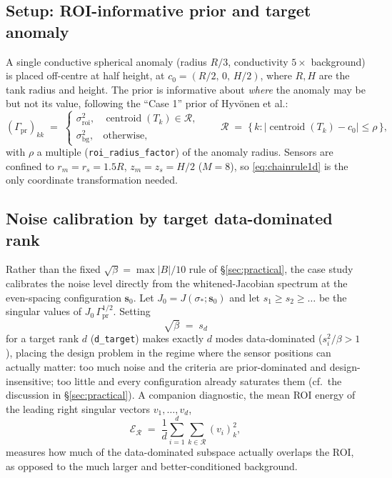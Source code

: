 \documentclass[11pt,a4paper]{article}
\newcommand{\Gprior}{\Gamma_{\mathrm{pr}}}
\newcommand{\code}[1]{\texttt{#1}}
\begin{document}
\subsection{Setup: ROI-informative prior and target anomaly}

A single conductive spherical anomaly (radius $R/3$, conductivity $5\times$ background) is placed
off-centre at half height, at $c_0 = (R/2,\,0,\,H/2)$, where $R,H$ are the tank radius and height.
The prior is informative about \emph{where} the anomaly may be but not its value, following the
``Case 1'' prior of Hyv\"onen et al.:
\begin{equation}
\label{eq:roiprior}
  (\Gprior)_{kk} \;=\;
  \begin{cases}
    \sigma_{\mathrm{roi}}^2, & \operatorname{centroid}(T_k) \in \mathcal{R}, \\[2pt]
    \sigma_{\mathrm{bg}}^2, & \text{otherwise},
  \end{cases}
  \qquad
  \mathcal{R} \;=\; \{\, k : |\operatorname{centroid}(T_k) - c_0| \le \rho \,\},
\end{equation}
with $\rho$ a multiple (\code{roi\_radius\_factor}) of the anomaly radius. Sensors are confined to
$r_m = r_s = 1.5R$, $z_m = z_s = H/2$ ($M = 8$), so \eqref{eq:chainrule1d} is the only
coordinate transformation needed.

\subsection{Noise calibration by target data-dominated rank}

Rather than the fixed $\sqrt\beta = \max|B|/10$ rule of \S\ref{sec:practical}, the case study
calibrates the noise level directly from the whitened-Jacobian spectrum at the even-spacing
configuration $\bm s_0$. Let $J_0 = J(\sigma_*;\bm s_0)$ and let $s_1 \ge s_2 \ge \dots$ be the
singular values of $J_0\, \Gprior^{1/2}$. Setting
\begin{equation}
\label{eq:noisecal}
  \sqrt\beta \;=\; s_{d}
\end{equation}
for a target rank $d$ (\code{d\_target}) makes exactly $d$ modes data-dominated
($s_i^2/\beta > 1$), placing the design problem in the regime where the sensor positions can
actually matter: too much noise and the criteria are prior-dominated and design-insensitive; too
little and every configuration already saturates them (cf.\ the discussion in
\S\ref{sec:practical}). A companion diagnostic, the mean ROI energy of the leading right
singular vectors $v_1,\dots,v_d$,
\begin{equation}
\label{eq:roienergy}
  \mathcal{E}_{\mathcal R} \;=\; \frac{1}{d} \sum_{i=1}^{d} \sum_{k \in \mathcal R} (v_i)_k^2 ,
\end{equation}
measures how much of the data-dominated subspace actually overlaps the ROI, as opposed to the
much larger and better-conditioned background.
\end{document}

